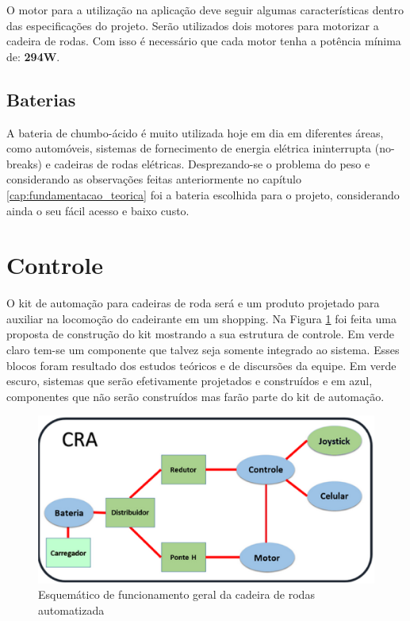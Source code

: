 O motor para a utilização na aplicação deve seguir algumas características dentro das especificações do projeto. Serão utilizados dois motores para motorizar a cadeira de rodas. Com isso é necessário que cada motor tenha a potência mínima de: \textbf{294W}.

\subsection{Baterias}
A bateria de chumbo-ácido é muito utilizada hoje em dia em diferentes áreas,  como automóveis, sistemas de fornecimento de energia elétrica ininterrupta (no-breaks) e cadeiras de rodas elétricas. Desprezando-se o problema do peso e considerando as observações feitas anteriormente no capítulo \ref{cap:fundamentacao_teorica} foi a bateria escolhida para o projeto, considerando ainda o seu fácil acesso e baixo  custo.

\section{Controle}

O kit de automação para cadeiras de roda será e um produto projetado para auxiliar na locomoção do cadeirante em um shopping. Na Figura \ref{fig:esquema_controle} foi feita uma proposta de construção do kit mostrando a sua estrutura de controle. Em verde claro tem-se um componente que talvez seja somente integrado ao sistema. Esses blocos foram resultado dos estudos teóricos e de discursões da equipe. Em verde escuro, sistemas que serão efetivamente projetados e construídos e em azul, componentes que não serão construídos mas farão parte do kit de automação.

\begin{figure}[!htb]
\centering
  \includegraphics[keepaspectratio=true,scale=0.6]{figuras/controle/esquema_controle}
\caption{Esquemático de funcionamento geral da cadeira de rodas automatizada}
\label{fig:esquema_controle}
\end{figure}


